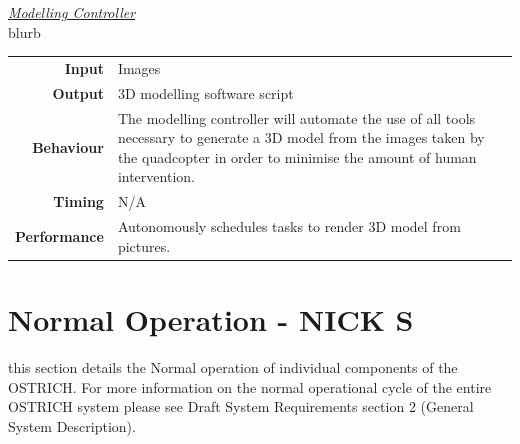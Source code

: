 \documentclass[10pt,letterpaper]{article}
\begin{document}
\underline{\textit{Modelling Controller}} \\[2mm]
blurb
\begin{center}
  \begin{tabular}{r p{8.5cm}}
      \textbf{Input} & Images \\
      \textbf{Output} & 3D modelling software script \\
      \textbf{Behaviour} & The  modelling controller will automate the use of all tools necessary to generate a 3D model from the images taken by the quadcopter in order to minimise the amount of human intervention. \\
      \textbf{Timing} & N/A \\
      \textbf{Performance} & Autonomously schedules tasks to render 3D model from pictures. 
  \end{tabular}
\end{center}


\newpage


\section{Normal Operation - NICK S}
this section details the Normal operation of individual components of the OSTRICH. For more information on the normal operational cycle of the entire OSTRICH system please see Draft System Requirements section 2 (General System Description).
\end{document}

